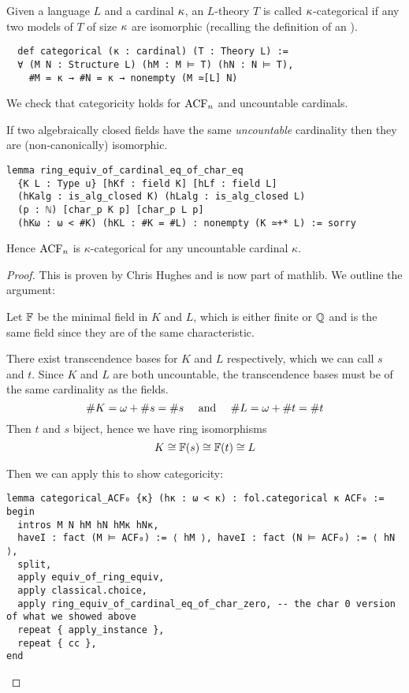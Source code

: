 \begin{dfn}[Categoricity]
    Given a language $L$ and a cardinal $\kappa$,
    an $L$-theory $T$ is called $\kappa$-categorical
    if any two models of $T$ of size $\kappa$ are isomorphic
    (recalling the definition of an
    ).

    \begin{lstlisting}
  def categorical (κ : cardinal) (T : Theory L) :=
  ∀ (M N : Structure L) (hM : M ⊨ T) (hN : N ⊨ T),
    #M = κ → #N = κ → nonempty (M ≃[L] N) \end{lstlisting}
\end{dfn}

We check that categoricity holds for $\operatorname{ACF}_{n}$ and uncountable cardinals.
\begin{prop}
  If two algebraically closed fields have the same \textit{uncountable}
  cardinality then they are (non-canonically) isomorphic.
  \begin{lstlisting}
lemma ring_equiv_of_cardinal_eq_of_char_eq
  {K L : Type u} [hKf : field K] [hLf : field L]
  (hKalg : is_alg_closed K) (hLalg : is_alg_closed L)
  (p : ℕ) [char_p K p] [char_p L p]
  (hKω : ω < #K) (hKL : #K = #L) : nonempty (K ≃+* L) := sorry \end{lstlisting}

  Hence $\operatorname{ACF}_{n}$ is $\kappa$-categorical for any uncountable cardinal $\kappa$.
\end{prop}
\begin{proof}
  This is proven by Chris Hughes and is now part of mathlib.
  We outline the argument:

  Let $\mathbb{F}$ be the minimal field in $K$ and $L$,
  which is either finite or $\mathbb{Q}$
  and is the same field since they are of the same characteristic.

  There exist transcendence bases for $K$ and $L$ respectively,
  which we can call $s$ and $t$.
  Since $K$ and $L$ are both uncountable,
  the transcendence bases must be of the same cardinality as the fields.
  \[ \# K = \omega + \# s = \# s \quad \text{ and }
    \quad \# L = \omega + \# t = \# t \]
  Then $t$ and $s$ biject, hence we have ring isomorphisms
  \[K \cong \mathbb{F}(s) \cong \mathbb{F}(t) \cong L\]

  Then we can apply this to show categoricity:

\begin{lstlisting}
lemma categorical_ACF₀ {κ} (hκ : ω < κ) : fol.categorical κ ACF₀ :=
begin
  intros M N hM hN hMκ hNκ,
  haveI : fact (M ⊨ ACF₀) := ⟨ hM ⟩, haveI : fact (N ⊨ ACF₀) := ⟨ hN ⟩,
  split,
  apply equiv_of_ring_equiv,
  apply classical.choice,
  apply ring_equiv_of_cardinal_eq_of_char_zero, -- the char 0 version of what we showed above
  repeat { apply_instance },
  repeat { cc },
end\end{lstlisting}
\end{proof}

